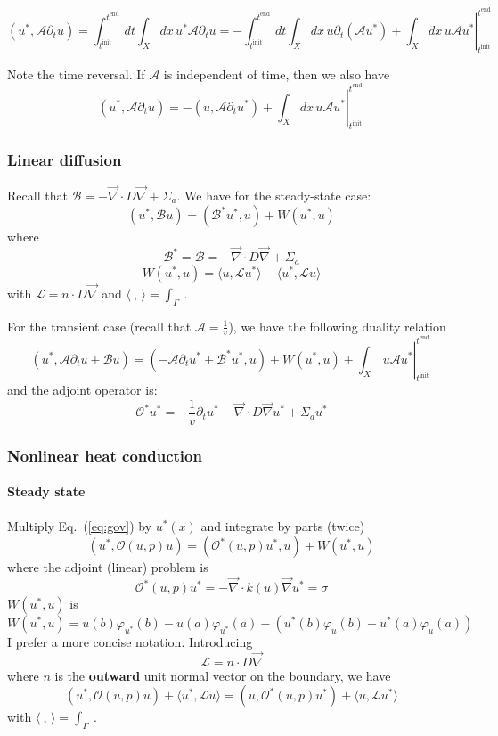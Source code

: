 \documentclass[11pt]{article}
\renewcommand{\div}{\vec{\nabla}\! \cdot \!}
\newcommand{\grad}{\vec{\nabla}}
\newcommand{\eqt}[1]{Eq.~(\ref{#1})}                     %
\newcommand{\be}{\begin{equation}}
\newcommand{\ee}{\end{equation}}
\renewcommand{\O}{\mathcal{O}}
\newcommand{\mc}[1]{\mathcal{#1}}
\newcommand{\us}{{u^\ast}}
\newcommand{\ti}{ {t^{\text{init}}} }
\newcommand{\te}{ {t^{\text{end }}} }
\begin{document}
\be
(\us,\mc{A} \partial_t u ) 
=  \int_\ti^\te dt \int_X dx \, \us \mc{A} \partial_t u
= -\int_\ti^\te dt \int_X dx \, u  \partial_t (\mc{A}\us) + 
\left. \int_X dx \, u \mc{A} \us \right|_\ti^\te 
\ee

Note the time reversal.
If $\mc{A}$ is independent of time, then we also have 
\be
(\us,\mc{A} \partial_t u )  
= -(u , \mc{A} \partial_t \us ) + 
\left. \int_X dx \, u \mc{A} \us \right|_\ti^\te 
\ee

\subsubsection{Linear diffusion}

Recall that $ \mc{B} =  -\div D \grad   + \Sigma_a $. We have for the steady-state case:
\be
(\us,\mc{B}u) = (\mc{B}^\ast\us,u) + W(\us,u)
\ee
where
\be
\mc{B}^\ast= \mc{B} =  -\div D \grad   + \Sigma_a 
\ee
\be
W(\us,u) = \langle u, \mc{L} \us \rangle  -  \langle \us, \mc{L} u \rangle
\ee
with $\mc{L} = n \cdot D\grad$ and $\langle \  , \, \rangle = \int_{\Gamma}\ $.


For the transient case (recall that $\mc{A} = \frac{1}{v}$), we have the following duality relation
\be
(\us,\mc{A}\partial_t u + \mc{B}u) = (-\mc{A}\partial_t \us +\mc{B}^\ast\us,u) + W(\us,u) + \left. \int_X \, u \mc{A} \us \right|_\ti^\te 
\ee
and the adjoint operator is:
\be
\O^\ast \us = -\frac{1}{v} \partial_t \us  -\div D \grad \us  + \Sigma_a \us 
\ee

\subsubsection{Nonlinear heat conduction}

\paragraph{Steady state} 

Multiply \eqt{eq:gov} by $\us(x)$ and integrate by parts (twice)
\be
(\us,\O(u,p)u) = (\O^\ast(u,p)\us,u) + W(\us,u)
\ee
where the adjoint (linear) problem is
\be
\O^\ast(u,p)\us = -\div k(u)  \grad \us = \sigma
\ee
%
$W(\us,u)$ is
\be
W(\us,u) = u(b)\varphi_\us(b)-u(a)\varphi_\us(a) -\left( \us(b)\varphi_u(b) -\us(a)\varphi_u(a)\right)
\ee
I prefer a more concise notation. Introducing
\be
\mc{L} = n \cdot D\grad
\ee where $n$ is the {\bf outward} unit normal vector on the boundary, 
we have
\be
(\us, \O(u,p)u) + \langle \us, \mc{L} u \rangle = (u, \O^\ast(u,p)\us) + \langle u, \mc{L} \us \rangle 
\ee
with $\langle \  , \, \rangle = \int_{\Gamma}\ $.
\end{document}
